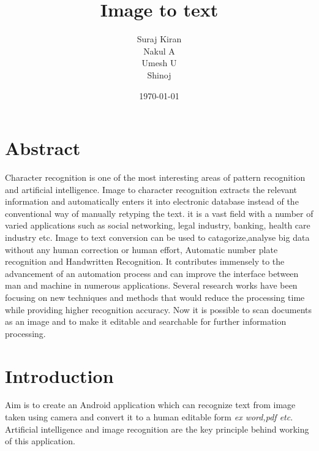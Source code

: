 \documentclass{article}
\title{Image to text} %
\author{Suraj Kiran\\Nakul A\\Umesh U\\Shinoj} %
\date{\today} %
\begin{document}
\maketitle %

\newpage



\section{Abstract}

Character recognition is one of the most
interesting areas of pattern recognition and artificial
intelligence. Image to character recognition extracts
the relevant information and automatically enters it
into electronic database instead of the conventional
way of manually retyping the text. it is a vast field with a number of varied
applications such as social networking, legal industry,
banking, health care industry etc. Image to text conversion can be used to catagorize,analyse big data without any human correction or human
effort, Automatic number plate recognition and
Handwritten Recognition. It contributes
immensely to the advancement of an automation
process and can improve the interface between man
and machine in numerous applications. Several
research works have been focusing on new
techniques and methods that would reduce the
processing time while providing higher recognition
accuracy. Now it is possible to scan documents as an
image and to make it editable and searchable for
further information processing.


\section{Introduction}
Aim is to create an Android application which can recognize text from image taken using camera and convert it to a human editable form \textit{ex word,pdf etc}.\\
Artificial intelligence and image recognition are the key principle behind working of this application.
\end{document}
